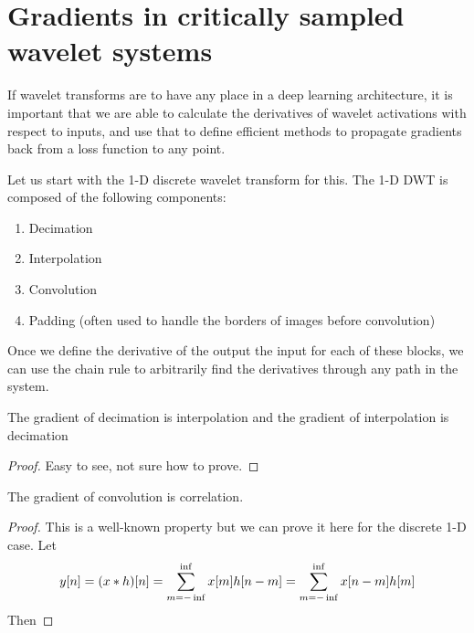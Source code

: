 \section{Gradients in critically sampled wavelet systems}

If wavelet transforms are to have any place in a deep learning architecture, it is important that we
are able to calculate the derivatives of wavelet activations with respect to inputs, and use that to 
define efficient methods to propagate gradients back from a loss function to any point. 

Let us start with the 1-D discrete wavelet transform for this. The 1-D DWT is composed of the
following components:

\begin{enumerate}
  \item Decimation
  \item Interpolation
  \item Convolution 
  \item Padding (often used to handle the borders of images before convolution)
\end{enumerate}

Once we define the derivative of the output \wrt the input for each of these blocks, we can use the
chain rule to arbitrarily find the derivatives through any path in the system.

\begin{lemma}
  The gradient of decimation is interpolation and the gradient of interpolation is decimation
\end{lemma}
\begin{proof}
  Easy to see, not sure how to prove.
\end{proof}

\begin{lemma}
  The gradient of convolution is correlation.
\end{lemma}
\begin{proof}
  This is a well-known property but we can prove it here for the discrete 1-D case. Let
  $$y[n] = (x \ast h)[n] = \sum_{m=-\inf}^{\inf} x[m]h[n-m] = \sum_{m=-\inf}^{\inf} x[n-m]h[m] $$
  Then 
\end{proof}
